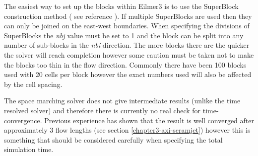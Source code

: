 The easiest way to set up the blocks within Eilmer3 is to use the SuperBlock construction method ( see reference \cite{Jacobs2008}). If multiple SuperBlocks are used then they can only be joined on the east-west boundaries. When specifying the divisions of SuperBlocks the \textit{nbj} value must be set to 1 and the block can be split into any number of sub-blocks in the \textit{nbi} direction. The more blocks there are the quicker the solver will reach completion however some caution must be taken not to make the blocks too thin in the flow direction. Commonly there have been 100 blocks used with 20 cells per block however the exact numbers used will also be affected by the cell spacing.

The space marching solver does not give intermediate results (unlike the time resolved solver) and therefore there is currently no real check for time-convergence. Previous experience has shown that the result is well converged after approximately 3 flow lengths (see section \ref{chapter3-axi-scramjet}) however this is something that should be considered carefully when specifying the total simulation time.